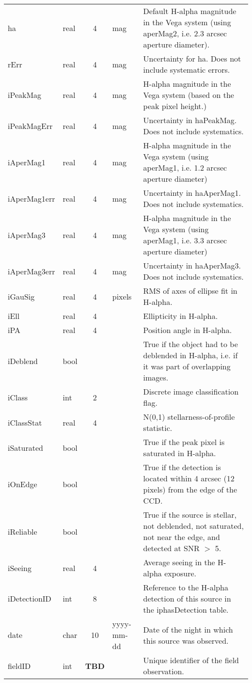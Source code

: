\documentclass[12pt]{article}
\newcommand{\tbd}{{\tiny \textbf{TBD}}}
\begin{document}
\begin{center}
\begin{longtable}{llclp{9cm}}
ha & real & 4 & mag & Default H-alpha magnitude in the Vega system (using aperMag2, i.e. 2.3 arcsec aperture diameter). \\ 
rErr & real & 4 & mag & Uncertainty for ha. Does not include systematic errors. \\ 
iPeakMag & real & 4 & mag & H-alpha magnitude in the Vega system (based on the peak pixel height.) \\ 
iPeakMagErr & real & 4 & mag & Uncertainty in haPeakMag. Does not include systematics. \\ 
iAperMag1 & real & 4 & mag & H-alpha magnitude in the Vega system (using aperMag1, i.e. 1.2 arcsec aperture diameter) \\ 
iAperMag1err & real & 4 & mag & Uncertainty in haAperMag1. Does not include systematics. \\ 
iAperMag3 & real & 4 & mag & H-alpha magnitude in the Vega system (using aperMag1, i.e. 3.3 arcsec aperture diameter) \\ 
iAperMag3err & real & 4 & mag & Uncertainty in haAperMag3. Does not include systematics. \\ 
iGauSig & real & 4 & pixels & RMS of axes of ellipse fit in H-alpha. \\ 
iEll & real & 4 & & Ellipticity in H-alpha. \\
iPA & real & 4 & & Position angle in H-alpha. \\
iDeblend & bool &  &  & True if the object had to be deblended in H-alpha, i.e. if it was part of overlapping images. \\ 
iClass & int & 2 & & Discrete image classification flag. \\
iClassStat & real & 4 & & N(0,1) stellarness-of-profile statistic. \\
iSaturated & bool &  &  & True if the peak pixel is saturated in H-alpha. \\ 
iOnEdge & bool &  &  & True if the detection is located within 4 arcsec (12 pixels) from the edge of the CCD. \\ 
iReliable & bool & & & True if the source is stellar, not deblended, not saturated, not near the edge, and detected at SNR $>$ 5. \\
iSeeing & real & 4 & & Average seeing in the H-alpha exposure. \\
iDetectionID & int & 8 & & Reference to the H-alpha detection of this source in the iphasDetection table. \\

date & char & 10 & yyyy-mm-dd & Date of the night in which this source was 
observed. \\
fieldID & int & \tbd & & Unique identifier of the field observation. \\


\end{longtable}
\end{center}
\end{document}

